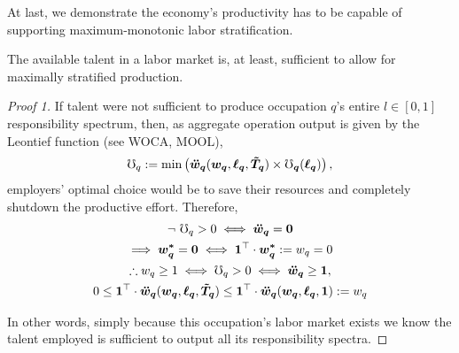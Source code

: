 \documentclass[hidelinks, nonatbib]{elsarticle}
\begin{document}
At last, we demonstrate the economy's productivity has to be capable of supporting maximum-monotonic labor stratification.
\begin{lemma}
    The available talent in a labor market is, at least, sufficient to allow for maximally stratified production.
    
    \begin{proof}[Proof 1]
        If talent were not sufficient to produce occupation $q$'s entire $l \in [0,1]$ responsibility spectrum, then, as aggregate operation output is given by the Leontief function (see WOCA, MOOL),
        \begin{gather}
            \mho_q
            :=
            \min\left(
                \boldsymbol{\ddot{w}_{q}}(
                    \boldsymbol{w_{q}},
                    \boldsymbol{\ell_{q}},
                    \boldsymbol{\tilde{T}_{q}}
                )
                \times
                \boldsymbol{\mho_{q}}(
                    \boldsymbol{\ell_{q}}
                )
            \right)
        ,
        \end{gather}
        employers' optimal choice would be to save their resources and completely shutdown the productive effort. Therefore,
        \begin{gather}
        \lnot \
        \mho_q > 0
        \iff
        \boldsymbol{\ddot{w}_{q}}
        =
        \boldsymbol{0}
        \\
        \implies
        \boldsymbol{w_{q}^{*}}
        =
        \boldsymbol{0}
        \iff
        \boldsymbol{1} ^ {\top}
        \cdot
        \boldsymbol{w_{q}^{*}}
        :=
        w_q
        =
        0
        \\
        \therefore
        w_q \geq 1
        \iff 
        \mho_q > 0
        \iff
        \boldsymbol{\ddot{w}_{q}}
        \geq
        \boldsymbol{1}
        ,
        \\
        0
        \leq
        \boldsymbol{1} ^ {\top}
        \cdot
        \boldsymbol{\ddot{w}_{q}}(
            \boldsymbol{w_{q}},
            \boldsymbol{\ell_{q}},
            \boldsymbol{\tilde{T}_{q}}
        )
        \leq
        \boldsymbol{1} ^ {\top}
        \cdot
        \boldsymbol{\ddot{w}_{q}}(
            \boldsymbol{w_{q}},
            \boldsymbol{\ell_{q}},
            \boldsymbol{1}
        )
        :=
        w_q
        \end{gather}

        In other words, simply because this occupation's labor market exists we know the talent employed is sufficient to output all its responsibility spectra.
        

\end{proof}
\end{lemma}
\end{document}

